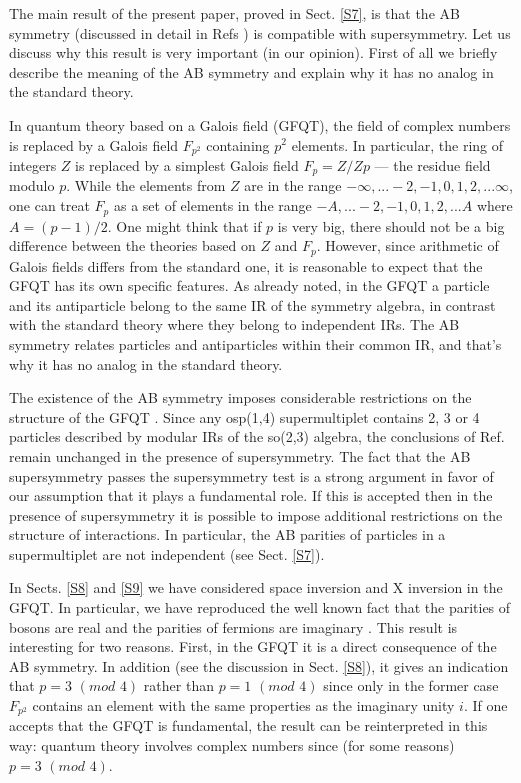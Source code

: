 \documentclass[a4paper,12pt]{article}%
\begin{document}
The main result of the present paper, proved in Sect.
\ref{S7}, is that the AB symmetry (discussed in 
detail in Refs \cite{lev2,lev3}) is compatible with
supersymmetry. Let us discuss why this result is very
important (in our opinion). First of all we briefly
describe the meaning of the AB symmetry and explain 
why it has no analog in the standard theory.

In quantum theory based on a Galois field (GFQT),
the field of complex numbers is replaced by a Galois
field $F_{p^2}$ containing $p^2$ elements. In 
particular, the ring of integers $Z$ is replaced by
a simplest Galois field $F_p=Z/Zp$ --- the residue
field modulo $p$. While the elements from $Z$ are
in the range $-\infty,...-2,-1,0,1,2,...\infty$,
one can treat $F_p$ as a set of elements in the range
$-A,...-2,-1,0,1,2,...A$ where $A=(p-1)/2$. One might
think that if $p$ is very big, there should not be
a big difference between the theories based on $Z$ 
and $F_p$. However, since arithmetic of Galois fields
differs from the standard one, it is reasonable to
expect that the GFQT has its own specific features.
As already noted, in the GFQT a particle and its
antiparticle belong to the same IR of the symmetry
algebra, in contrast with the standard theory where
they belong to independent IRs. The AB symmetry 
relates particles and antiparticles within their
common IR, and that's why it has no analog in the
standard theory.

The existence of the AB symmetry imposes considerable
restrictions on the structure of the GFQT \cite{lev3}.
Since any osp(1,4) supermultiplet contains 2, 3 or 4
particles described by modular IRs of the so(2,3)
algebra, the conclusions of Ref. \cite{lev3} remain
unchanged in the presence of supersymmetry. The fact
that the AB supersymmetry passes the supersymmetry test
is a strong argument in favor of our assumption that
it plays a fundamental role. If this is accepted 
then in the presence
of supersymmetry it is possible to impose additional
restrictions on the structure of interactions. In
particular, the AB parities of particles in a
supermultiplet are not independent (see Sect. \ref{S7}).

In Sects. \ref{S8} and \ref{S9} we have considered space
inversion and X inversion in the GFQT. In particular,
we have reproduced the well known fact that the parities
of bosons are real and the parities of fermions are 
imaginary \cite{Wein-super}. This result is interesting
for two reasons. First, in the GFQT it is a direct
consequence of the AB symmetry. In addition (see the
discussion in Sect. \ref{S8}), it gives an indication
that $p=3\,\, (mod\,\, 4)$ rather than 
$p=1\,\, (mod\,\, 4)$ since only in the former case
$F_{p^2}$ contains an element with the same properties as
the imaginary unity $i$. If one accepts that the GFQT is
fundamental, the result can be reinterpreted in this
way: quantum theory involves complex numbers since 
(for some reasons) $p=3\,\, (mod\,\, 4)$.
\end{document}

